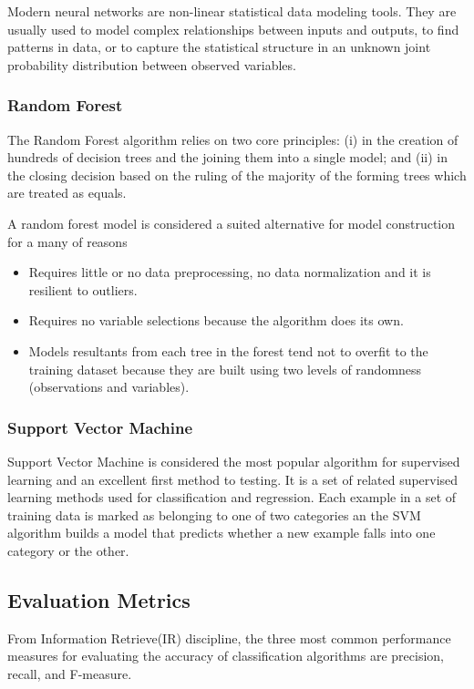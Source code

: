 \documentclass[10pt, conference]{IEEEtran}
\begin{document}
Modern neural networks are non-linear statistical data modeling tools. They are usually used to model complex relationships between inputs and outputs, to find patterns in data, or to capture the statistical structure in an unknown joint probability distribution between observed variables.

\subsubsection{Random Forest}
The Random Forest algorithm\cite{Breiman2001} relies on two core principles: (i) in the creation of hundreds of decision trees and the joining them into a single model; and (ii) in the closing decision based on the ruling of the majority of the forming trees which are treated as equals.

A random forest model is considered a suited alternative for model construction for a many of reasons\cite{Williams2011} 

\begin{itemize}
  \item Requires little or no data preprocessing, no data normalization and it is resilient to outliers.
  \item Requires no variable selections because the algorithm does its own.
  \item Models resultants from each tree in the forest tend not to overfit to the training dataset because they are built using two levels of randomness (observations and variables).
\end{itemize}

\subsubsection{Support Vector Machine}
Support Vector Machine is considered the most popular algorithm for supervised learning and an excellent first method to testing\cite{Russell2010}. It is a set of related supervised learning methods used for classification and regression. Each example in a set of training data is marked as belonging to one of two categories an the SVM algorithm builds a model that predicts whether a new example falls into one category or the other. 

\subsection{Evaluation Metrics}
From Information Retrieve(IR) discipline, the three most common performance measures for evaluating the accuracy of classification algorithms are precision, recall, and F-measure\cite{Feldman2007}. 
\end{document}
